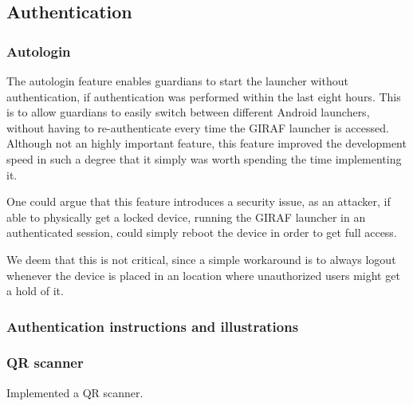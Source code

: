 \subsection{Authentication}
\label{backlog:authentication}

\subsubsection{Autologin}
\label{backlog:autologin}

The autologin feature enables guardians to start the launcher without authentication, if authentication was performed within the last eight hours. This is to allow guardians to easily switch between different Android launchers, without having to re-authenticate every time the GIRAF launcher is accessed. Although not an highly important feature, this feature improved the development speed in such a degree that it simply was worth spending the time implementing it.

One could argue that this feature introduces a security issue, as an attacker, if able to physically get a locked device, running the GIRAF launcher in an authenticated session, could simply reboot the device in order to get full access.

We deem that this is not critical, since a simple workaround is to always logout whenever the device is placed in an location where unauthorized users might get a hold of it.

\subsubsection{Authentication instructions and illustrations}
\label{backlog:authentication_illustrations}



\subsubsection{QR scanner}
\label{backlog:QR_scanner}

Implemented a QR scanner.
